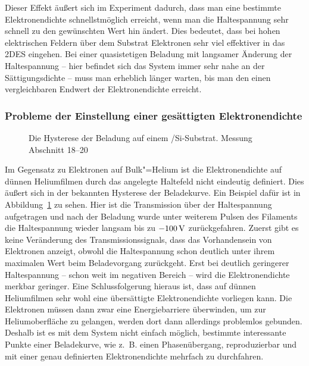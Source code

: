 Dieser Effekt äußert sich im Experiment dadurch, dass man eine bestimmte Elektronendichte schnellstmöglich erreicht, wenn man die Haltespannung sehr schnell zu den gewünschten Wert hin ändert. Dies bedeutet, dass bei hohen elektrischen Feldern über dem Substrat Elektronen sehr viel effektiver in das 2DES eingehen. Bei einer quasistetigen Beladung mit langsamer Änderung der Haltespannung -- hier befindet sich das System immer sehr nahe an der Sättigungsdichte -- muss man erheblich länger warten, bis man den einen vergleichbaren Endwert der Elektronendichte erreicht.

\subsubsection{Probleme der Einstellung einer gesättigten Elektronendichte}
\label{ssec:saturation_film}
\begin{figure}[h!tb]
    \centerline{%
        }%
    \caption[Die Hysterese der Beladung auf einem \SiO /Si-Substrat]{Die Hysterese der Beladung auf einem \SiO /Si-Substrat. Messung  Abschnitt 18--20}
    \label{fig:film_hysteresis}
\end{figure}
Im Gegensatz zu Elektronen auf Bulk"=Helium ist die Elektronendichte auf dünnen Heliumfilmen durch das angelegte Haltefeld nicht eindeutig definiert. Dies äußert sich in der bekannten Hysterese der Beladekurve. Ein Beispiel dafür ist in Abbildung~\ref{fig:film_hysteresis} zu sehen. Hier ist die Transmission über der Haltespannung aufgetragen und nach der Beladung wurde unter weiterem Pulsen des Filaments die Haltespannung wieder langsam bis zu $\unit[-100]{V}$ zurückgefahren. Zuerst gibt es keine Veränderung des Transmissionssignals, dass das Vorhandensein von Elektronen anzeigt, obwohl die Haltespannung schon deutlich unter ihrem maximalen Wert beim Beladevorgang zurückgeht. Erst bei deutlich geringerer Haltespannung -- schon weit im negativen Bereich -- wird die Elektronendichte merkbar geringer. Eine Schlussfolgerung hieraus ist, dass auf dünnen Heliumfilmen sehr wohl eine übersättigte Elektronendichte vorliegen kann. Die Elektronen müssen dann zwar eine Energie\-barriere überwinden, um zur Heliumoberfläche zu gelangen, werden dort dann allerdings problemlos gebunden. Deshalb ist es mit dem System nicht einfach möglich, bestimmte interessante Punkte einer Beladekurve, wie z.~B. einen Phasenübergang, reproduzierbar und mit einer genau definierten Elektronendichte mehrfach zu durchfahren.

